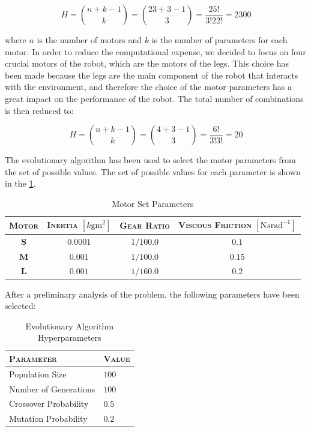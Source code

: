 \begin{equation}
    H = \binom{n + k - 1}{k} = \binom{23 + 3 - 1}{3} = \frac{25!}{3! 22!} = 2300
\end{equation}

where $n$ is the number of motors and $k$ is the number of parameters for each motor. In order to reduce the computational expense, we decided to focus on four crucial motors of the robot, which are the motors of the legs. This choice has been made because the legs are the main component of the robot that interacts with the environment, and therefore the choice of the motor parameters has a great impact on the performance of the robot. The total number of combinations is then reduced to:

\begin{equation}
    H = \binom{n + k - 1}{k} = \binom{4 + 3 - 1}{3} = \frac{6!}{3! 3!} = 20
\end{equation}

The evolutionary algorithm has been used to select the motor parameters from the set of possible values. The set of possible values for each parameter is shown in the \cref{tab:motorparams}.

\begin{table}[h]
    \centering
    \begin{tabular}{c c c c}
        \toprule
        \textsc{Motor} & \textsc{Inertia} $[k\mathrm{gm}^2]$ & \textsc{Gear Ratio} & \textsc{Viscous Friction} $[\mathrm{N}s\mathrm{rad}^{-1}]$ \\
        \midrule
        \textbf{S}     & $0.0001$                            & $1/100.0$           & $0.1$                                                      \\
        \textbf{M}     & $0.001$                             & $1/100.0$           & $0.15$                                                     \\
        \textbf{L}     & $0.001$                             & $1/160.0$           & $0.2$                                                      \\
        \bottomrule
    \end{tabular}
    \caption{Motor Set Parameters}
    \label{tab:motorparams}
\end{table}


After a preliminary analysis of the problem, the following parameters have been selected:

\begin{table}
    \centering
    \begin{tabular}{ll}
        \toprule
        \textsc{Parameter}    & \textsc{Value} \\
        \midrule
        Population Size       & $100$          \\
        Number of Generations & $100$          \\
        Crossover Probability & $0.5$          \\
        Mutation Probability  & $0.2$          \\
        \bottomrule
    \end{tabular}
    \caption{Evolutionary Algorithm Hyperparameters}
\end{table}

